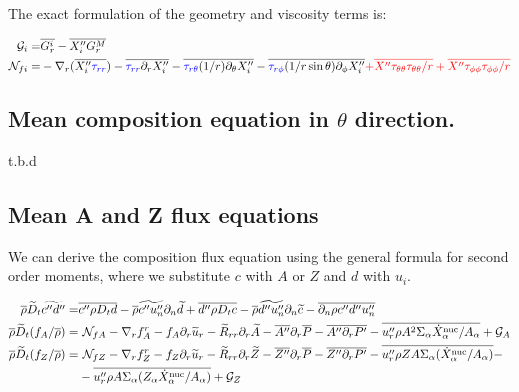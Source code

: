 \documentclass[10pt,paper=a4]{report}
\newcommand{\eht}{\overline}
\newcommand{\fht}{\widetilde}
\newcommand{\fav}{\widetilde}
\def\erho{\eht{\rho}}
\begin{document}
\noindent
The exact formulation of the geometry and viscosity terms is:

\begin{align}
{\mathcal G_i} = & {\eht{G_{r}^i} - \eht{X''_i G_r^M}}\\
{\mathcal N_{fi}} = &-\nabla_r (\eht{X''_i {\color{blue}\tau_{rr}}}) - \eht{{\color{blue}\tau_{rr}}\partial_r X''_i} - \eht{{\color{blue}\tau_{r\theta}}(1/r)\partial_\theta X''_i} - \eht{{\color{blue}\tau_{r\phi}}(1/r\sin{\theta})\partial_\phi X''_i}  {\color{red} +\overline{X''\tau_{\theta \theta} \tau_{\theta \theta}/r} + \overline{X''\tau_{\phi \phi} \tau_{\phi \phi}/r}}  
\end{align}

\subsection{Mean composition equation in $\theta$ direction.}

t.b.d


\subsection{Mean A and Z flux equations}

We can derive the composition flux equation using the general formula for second order moments, where we substitute $c$ with $A$ or $Z$ and $d$ with $u_i$.

\begin{align}
\overline{\rho}\widetilde{D}_t \widetilde{c''d''} = & \overline{c'' \rho D_t d} - \overline{\rho} \widetilde{c''u''_n}\partial_n \widetilde{d} + \overline{d'' \rho D_t c} - \overline{\rho} \widetilde{d''u''_n}\partial_n \widetilde{c} - \overline{\partial_n \rho c''d''u''_n} \\
\erho \fav{D}_t (f_A / \eht{\rho}) = &  \ {\mathcal N_{fA}} -\nabla_r f_A^r - f_A \partial_r \fht{u}_r - \fht{R}_{rr} \partial_r \fht{A} -\eht{A''} \partial_r \eht{P} - \eht{A'' \partial_r P'} - \overline{u''_r \rho A^2\Sigma_\alpha \dot{X}_\alpha^{\rm nuc} / A_\alpha} + {\mathcal G_A}                 \label{eq:rans_fabar} \\
\erho \fav{D}_t (f_Z / \eht{\rho}) = &  \ {\mathcal N_{fZ}} -\nabla_r f_Z^r  - f_Z \partial_r \fht{u}_r - \fht{R}_{rr} \partial_r \fht{Z} -\eht{Z''} \partial_r \eht{P} - \eht{Z'' \partial_r P'} - \overline{u''_r \rho Z A \Sigma_\alpha (\dot{X}_\alpha^{\rm nuc}/ A_\alpha)} - \nonumber \\
& - \overline{u''_r \rho A \Sigma_\alpha (Z_\alpha \dot{X}_\alpha^{\rm nuc} / A_\alpha)}  + {\mathcal G_Z}   \label{eq:rans_fzbar} 
\end{align}
\end{document}
